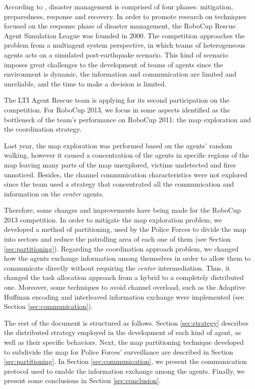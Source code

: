\documentclass{llncs}
\begin{document}
According to \cite{blanchardEtAl2007}, disaster management is comprised of four phases: mitigation, preparedness, response and recovery. In order to promote research on techniques focused on the response phase of disaster management, the RoboCup Rescue Agent Simulation League \cite{kitanoEtAl1999} was founded in 2000. The competition approaches the problem from a multiagent system perspective, in which teams of heterogeneous agents acts on a simulated post-earthquake scenario. This kind of scenario imposes great challenges to the development of teams of agents since the environment is dynamic, the information and communication are limited and unreliable, and the time to make a decision is limited.

The LTI Agent Rescue team is applying for its second participation on the competition. For RoboCup 2013, we focus in some aspects identified as the bottleneck of the team's performance on RoboCup 2011: the map exploration and the coordination strategy.

Last year, the map exploration was performed based on the agents' random walking, however it caused a concentration of the agents in specific regions of the map leaving many parts of the map unexplored, victims undetected and fires unnoticed. Besides, the channel communication characteristics were not explored since the team used a strategy that concentrated all the communication and information on the {\it center} agents.

Therefore, some changes and improvements have being made for the RoboCup 2013 competition. In order to mitigate the map exploration problem, we developed a method of partitioning, used by the Police Forces to divide the map into sectors and reduce the patrolling area of each one of them (see Section \ref{sec:partitioning}). Regarding the coordination approach problem, we changed how the agents exchange information among themselves in order to allow them to communicate directly without requiring the {\it center} intermediation. Thus, it changed the task allocation approach from a hybrid to a completely distributed one. Moreover, some techniques to avoid channel overload, such as the Adaptive Huffman encoding \cite{huffman1952,vitter1987} and interleaved information exchange were implemented (see Section \ref{sec:communication}).

The rest of the document is structured as follows. Section \ref{sec:strategy} describes the distributed strategy employed in the development of each kind of agent, as well as their specific behaviors. Next, the map partitioning technique developed to subdivide the map for Police Forces' surveillance are described in Section \ref{sec:partitioning}. In Section \ref{sec:communication}, we present the communication protocol used to enable the information exchange among the agents. Finally, we present some conclusions in Section \ref{sec:conclusion}.
\end{document}

